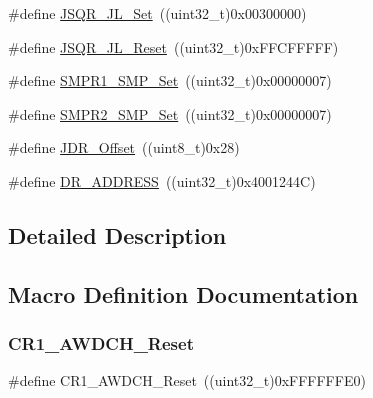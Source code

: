 \begin{DoxyCompactItemize}
\item 
\#define \hyperlink{group___a_d_c___private___defines_ga46af9e738702305be0127f6c15c4f7b0}{J\+S\+Q\+R\+\_\+\+J\+L\+\_\+\+Set}~((uint32\+\_\+t)0x00300000)
\item 
\#define \hyperlink{group___a_d_c___private___defines_gac8d1173791ea10bac7c53a368d593a16}{J\+S\+Q\+R\+\_\+\+J\+L\+\_\+\+Reset}~((uint32\+\_\+t)0x\+F\+F\+C\+F\+F\+F\+F\+F)
\item 
\#define \hyperlink{group___a_d_c___private___defines_ga244048ec3ba9461a6609942def9a15ba}{S\+M\+P\+R1\+\_\+\+S\+M\+P\+\_\+\+Set}~((uint32\+\_\+t)0x00000007)
\item 
\#define \hyperlink{group___a_d_c___private___defines_ga6555beb1970c42125678d80530bba4d3}{S\+M\+P\+R2\+\_\+\+S\+M\+P\+\_\+\+Set}~((uint32\+\_\+t)0x00000007)
\item 
\#define \hyperlink{group___a_d_c___private___defines_ga5671a68d6f0d01c6c465ee7a3a8f3eea}{J\+D\+R\+\_\+\+Offset}~((uint8\+\_\+t)0x28)
\item 
\#define \hyperlink{group___a_d_c___private___defines_ga35ecb1c96cfae175f5f00490e5e91e88}{D\+R\+\_\+\+A\+D\+D\+R\+E\+SS}~((uint32\+\_\+t)0x4001244\+C)
\end{DoxyCompactItemize}


\subsection{Detailed Description}


\subsection{Macro Definition Documentation}
\mbox{\label{group___a_d_c___private___defines_gabe7e68383d281e58707a1cd749a3374e}} 
\subsubsection{\texorpdfstring{C\+R1\+\_\+\+A\+W\+D\+C\+H\+\_\+\+Reset}{CR1\_AWDCH\_Reset}}
{\footnotesize\ttfamily \#define C\+R1\+\_\+\+A\+W\+D\+C\+H\+\_\+\+Reset~((uint32\+\_\+t)0x\+F\+F\+F\+F\+F\+F\+E0)}



